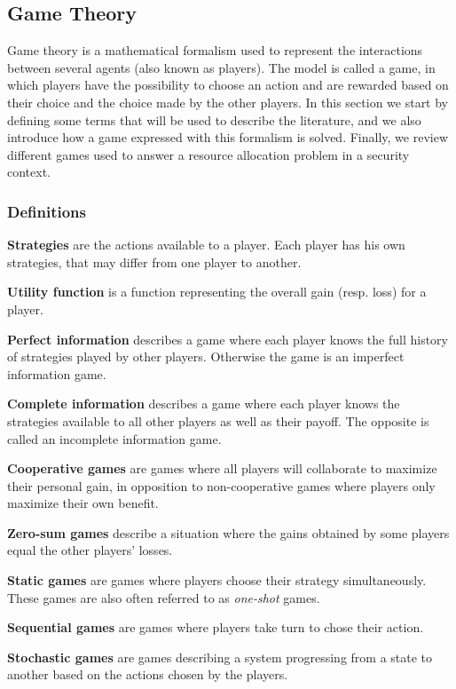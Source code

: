 \subsection{Game Theory}

Game theory is a mathematical formalism used to represent the interactions between several agents (also known as players).
The model is called a game, in which players have the possibility to choose an action and are rewarded based on their choice and the choice made by the other players.
In this section we start by defining some terms that will be used to describe the literature, and we also introduce how a game expressed with this formalism is solved. Finally, we review different games used to answer a resource allocation problem in a security context.

\subsubsection{Definitions}

\textbf{Strategies} are the actions available to a player. Each player has his own strategies, that may differ from one player to another.

\textbf{Utility function} is a function representing the overall gain (resp. loss) for a player.

\textbf{Perfect information} describes a game where each player knows the full history of strategies played by other players. Otherwise the game is an imperfect information game.

\textbf{Complete information} describes a game where each player knows the strategies available to all other players as well as their payoff. The opposite is called an incomplete information game.

\textbf{Cooperative games} are games where all players will collaborate to maximize their personal gain, in opposition to non-cooperative games where players only maximize their own benefit.

\textbf{Zero-sum games} describe a situation where the gains obtained by some players equal the other players' losses.

\textbf{Static games} are games where players choose their strategy simultaneously. These games are also often referred to as \textit{one-shot} games.

\textbf{Sequential games} are games where players take turn to chose their action.

\textbf{Stochastic games} are games describing a system progressing from a state to another based on the actions chosen by the players.

